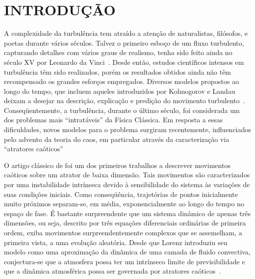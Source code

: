 
\chapter{INTRODUÇÃO}

A complexidade da turbulência tem atraído a atenção de naturalistas, filósofos, e poetas durante vários séculos. Talvez o primeiro esboço de um fluxo turbulento, capturando detalhes com vários graus de realismo, tenha sido feito ainda no século XV por Leonardo da Vinci~\cite{sreenivasan/99}. Desde então, estudos científicos intensos em turbulência têm sido realizados, porém os resultados obtidos ainda não têm recompensado os grandes esforços empregados. Diversos modelos propostos ao longo do tempo, que incluem aqueles introduzidos por Kolmogorov e Landau deixam a desejar na descrição, explicação e predição do movimento turbulento~\cite{ruelle/91}. Conseqüentemente, a turbulência, durante o último século, foi considerada um dos problemas mais ``intratáveis'' da Física Clássica. Em resposta a essas dificuldades, novos modelos para o problema surgiram recentemente, influenciados pelo advento da teoria do caos, em particular através da caracterização via ``atratores caóticos''~\cite{ruelltak/71} 

O artigo clássico de  foi um dos primeiros trabalhos a descrever movimentos caóticos sobre um atrator de baixa dimensão. Tais movimentos são caracterizados por uma instabilidade intrínseca devido à sensibilidade do sistema às variações de suas condições iniciais. Como conseqüência, trajetórias de pontos inicialmente muito próximos separam-se, em média, exponencialmente ao longo do tempo no espaço de fase. É bastante surpreendente que um sistema dinâmico de apenas três dimensões, ou seja, descrito por três equações diferenciais ordinárias de primeira ordem, exiba movimentos surpreendentemente complexos que se assemelham, a primeira vista, a uma evolução aleatória. Desde que Lorenz introduziu seu modelo como uma aproximação da dinâmica de uma camada de fluido convectiva, conjectura-se que a atmosfera possa ter um intrínseco limite de previsibilidade e que a dinâmica atmosférica possa ser governada por atratores caóticos~\cite{weber/95}. 

